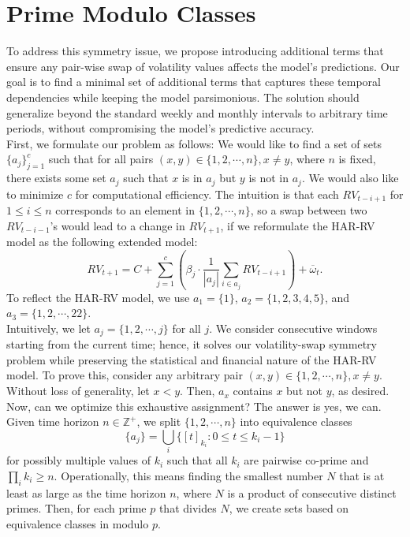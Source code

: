 ﻿\documentclass[11pt,a4paper]{article}
\begin{document}
\section{Prime Modulo Classes}
\noindent To address this symmetry issue, we propose introducing additional terms that ensure any pair-wise swap of volatility values affects the model's predictions. Our goal is to find a minimal set of additional terms that captures these temporal dependencies while keeping the model parsimonious. The solution should generalize beyond the standard weekly and monthly intervals to arbitrary time periods, without compromising the model's predictive accuracy.
\vspace{0.3cm}
\\ First, we formulate our problem as follows: We would like to find a set of sets $\{a_j\}_{j=1}^c$ such that for all pairs $(x, y) \in \{1, 2, \cdots, n\}, x \neq y$, where $n$ is fixed, there exists some set $a_j$ such that $x$ is in $a_j$ but $y$ is not in $a_j$. We would also like to minimize $c$ for computational efficiency. The intuition is that each $RV_{t-i+1}$ for $1 \leq i \leq n$ corresponds to an element in $\{1, 2, \cdots, n\}$, so a swap between two $RV_{t-i-1}$'s would lead to a change in $RV_{t+1}$, if we reformulate the HAR-RV model as the following extended model: $$RV_{t+1} = C + \sum_{j = 1}^c\left(\beta_j \cdot \frac{1}{|a_j|} \sum_{i \in a_j} RV_{t-i+1}\right) + \overline{\omega}_t.$$ To reflect the HAR-RV model, we use $a_1 = \{1\}$, $a_2 = \{1, 2, 3, 4, 5\}$, and $a_3 = \{1, 2, \cdots, 22\}$.
\vspace{0.3cm}
\\ Intuitively, we let $a_j = \{1, 2, \cdots, j\}$ for all $j$. We consider consecutive windows starting from the current time; hence, it solves our volatility-swap symmetry problem while preserving the statistical and financial nature of the HAR-RV model. To prove this, consider any arbitrary pair $(x, y) \in \{1, 2, \cdots, n\}, x \neq y$. Without loss of generality, let $x<y$. Then, $a_x$ contains $x$ but not $y$, as desired. Now, can we optimize this exhaustive assignment? The answer is yes, we can.
\vspace{0.3cm}
\\ Given time horizon $n\in \mathbb{Z}^+$, we split $\{1, 2, \cdots, n\}$ into equivalence classes $$\{a_j\} = \bigcup_{i} \{[t]_{k_i}: 0 \leq t \leq k_i-1\}$$ for possibly multiple values of $k_i$ such that all $k_i$ are pairwise co-prime and $\displaystyle\prod_i k_i \geq n$. Operationally, this means finding the smallest number $N$ that is at least as large as the time horizon $n$, where $N$ is a product of consecutive distinct primes. Then, for each prime $p$ that divides $N$, we create sets based on equivalence classes in modulo $p$.
\end{document}
